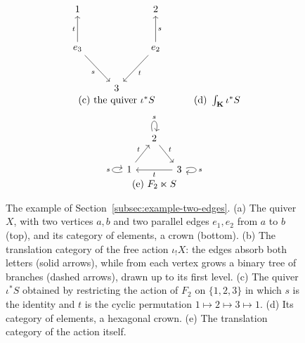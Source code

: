 \documentclass[11pt]{amsart}
\theoremstyle{definition}
\theoremstyle{remark}
\numberwithin{figure}{section}%
\begin{document}
\begin{figure}[!htbp]
\[\begin{array}{c@{\hspace{3em}}c}
\begin{tikzcd}[row sep=large, column sep=normal]
1 & & 2 \\
e_3 \arrow[u,"t"] \arrow[dr,"s"'] & & e_2 \arrow[u,"s"'] \arrow[dl,"t"] \\
 & 3 &
\end{tikzcd}
\\[6pt]
\text{(c) the quiver } \iota^*S & \text{(d) } \int_{\mathbf K}\iota^*S
\end{array}
\]
\[
\begin{array}{c}
\begin{tikzcd}[column sep=small]
 & 2 \arrow[dr,"t"] \arrow[loop above,"s"] & \\
1 \arrow[ur,"t"] \arrow[loop left,"s"] & & 3 \arrow[ll,"t"] \arrow[loop right,"s"]
\end{tikzcd}
\\[6pt]
\text{(e) } F_2\ltimes S
\end{array}
\]
\caption{The example of Section~\ref{subsec:example-two-edges}. (a) The quiver $X$, with two vertices $a,b$ and two parallel edges $e_1,e_2$ from $a$ to $b$ (top), and its category of elements, a crown (bottom). (b) The translation category of the free action $\iota_!X$: the edges absorb both letters (solid arrows), while from each vertex grows a binary tree of branches (dashed arrows), drawn up to its first level. (c) The quiver $\iota^*S$ obtained by restricting the action of $F_2$ on $\{1,2,3\}$ in which $s$ is the identity and $t$ is the cyclic permutation $1\mapsto2\mapsto3\mapsto1$. (d) Its category of elements, a hexagonal crown. (e) The translation category of the action itself.}
\label{fig:two-edges}
\end{figure}
\end{document}
